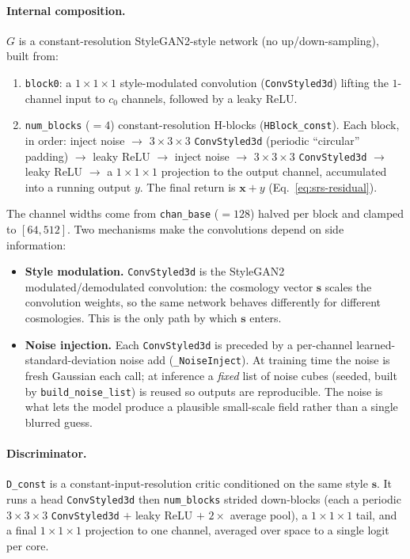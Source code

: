 \paragraph{Internal composition.} $G$ is a constant-resolution StyleGAN2-style
network (no up/down-sampling), built from:
\begin{enumerate}
  \item \texttt{block0}: a $1{\times}1{\times}1$ style-modulated convolution
  (\texttt{ConvStyled3d}) lifting the $1$-channel input to $c_0$ channels,
  followed by a leaky ReLU.
  \item \texttt{num\_blocks} ($=4$) constant-resolution H-blocks
  (\texttt{HBlock\_const}). Each block, in order: inject noise $\to$
  $3{\times}3{\times}3$ \texttt{ConvStyled3d} (periodic ``circular'' padding)
  $\to$ leaky ReLU $\to$ inject noise $\to$ $3{\times}3{\times}3$
  \texttt{ConvStyled3d} $\to$ leaky ReLU $\to$ a $1{\times}1{\times}1$ projection
  to the output channel, accumulated into a running output $y$. The final return
  is $\mathbf x + y$ (Eq.~\ref{eq:srs-residual}).
\end{enumerate}
The channel widths come from \texttt{chan\_base} ($=128$) halved per block and
clamped to $[64,512]$. Two mechanisms make the convolutions depend on side
information:
\begin{itemize}
  \item \textbf{Style modulation.} \texttt{ConvStyled3d} is the StyleGAN2
  modulated/demodulated convolution: the cosmology vector $\mathbf s$ scales the
  convolution weights, so the same network behaves differently for different
  cosmologies. This is the only path by which $\mathbf s$ enters.
  \item \textbf{Noise injection.} Each \texttt{ConvStyled3d} is preceded by a
  per-channel learned-standard-deviation noise add (\texttt{\_NoiseInject}). At
  training time the noise is fresh Gaussian each call; at inference a
  \emph{fixed} list of noise cubes (seeded, built by \texttt{build\_noise\_list})
  is reused so outputs are reproducible. The noise is what lets the model produce
  a plausible small-scale field rather than a single blurred guess.
\end{itemize}

\paragraph{Discriminator.} \texttt{D\_const} is a constant-input-resolution
critic conditioned on the same style $\mathbf s$. It runs a head
\texttt{ConvStyled3d} then \texttt{num\_blocks} strided down-blocks (each a
periodic $3{\times}3{\times}3$ \texttt{ConvStyled3d} $+$ leaky ReLU $+$
$2{\times}$ average pool), a $1{\times}1{\times}1$ tail, and a final
$1{\times}1{\times}1$ projection to one channel, averaged over space to a single
logit per core.

